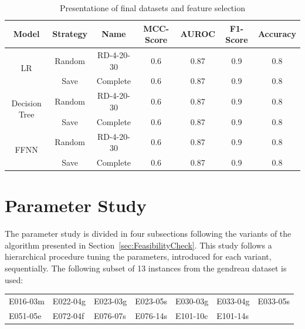 \begin{table}[ht]
    \centering
    \begin{tabular}{c c c c c c c}
        \toprule
        Model                          & Strategy & Name       & \gls{MCC}-Score & \gls{AUROC} & F1-Score & Accuracy \\
        \midrule
        \multirow{2}{*}{\gls{LR}}      & Random   & RD-4-20-30 & 0.6             & 0.87        & 0.9      & 0.8      \\
                                       & Save     & Complete   & 0.6             & 0.87        & 0.9      & 0.8      \\
        \midrule
        \multirow{2}{*}{Decision Tree} & Random   & RD-4-20-30 & 0.6             & 0.87        & 0.9      & 0.8      \\
                                       & Save     & Complete   & 0.6             & 0.87        & 0.9      & 0.8      \\
        \midrule
        \multirow{2}{*}{\gls{FFNN}}    & Random   & RD-4-20-30 & 0.6             & 0.87        & 0.9      & 0.8      \\
                                       & Save     & Complete   & 0.6             & 0.87        & 0.9      & 0.8      \\

        \bottomrule
    \end{tabular}
    \caption{Presentatione of final datasets and feature selection}
    \label{tab:final_dataset_features}
\end{table}

\section{Parameter Study}
\label{sec:parameter_study}

The parameter study is divided in four subsections following the variants of the algorithm
presented in Section~\ref{sec:FeasibilityCheck}. This study follows a hierarchical procedure
tuning the parameters, introduced for each variant, sequentially. The following subset of 13
instances from the gendreau dataset is used:


\begin{table}[ht]
    \centering
    \setlength{\tabcolsep}{0.75em}
    \def\arraystretch{1.5}
    \begin{tabular}{lllllll}
        E016-03m & E022-04g & E023-03g & E023-05s & E030-03g & E033-04g & E033-05s \\
        E051-05e & E072-04f & E076-07s & E076-14s & E101-10c & E101-14s &          \\
    \end{tabular}
\end{table}

